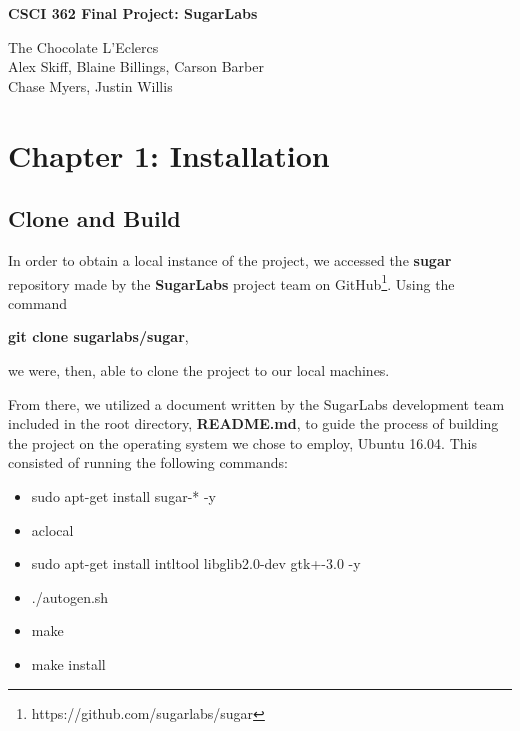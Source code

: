 \documentclass{article}
\begin{document}
\begin{center}
\textbf{CSCI 362 Final Project: SugarLabs}
\end{center}


\begin{center}

{The Chocolate L'Eclercs}\\
\vspace{0.2cm}
{Alex Skiff, Blaine Billings, Carson Barber}\\
{Chase Myers, Justin Willis}\\
\vspace{0.2cm}

\end{center}



\begin{abstract}
\end{abstract}

\section{Chapter 1: Installation}
\subsection{Clone and Build}
In order to obtain a local instance of the project, we accessed the \textbf{sugar} repository made by the \textbf{SugarLabs} project team on GitHub\footnote{https://github.com/sugarlabs/sugar}. Using the command 
\begin{center}
\textbf{git clone sugarlabs/sugar},
\end{center}
we were, then, able to clone the project to our local machines.

From there, we utilized a document written by the SugarLabs development team included in the root directory, \textbf{README.md}, to guide the process of building the project on the operating system we chose to employ, Ubuntu 16.04. This consisted of running the following commands:
\begin{itemize}
\itemsep-0.5em
\item[] sudo apt-get install sugar-* -y
\item[] aclocal
\item[] sudo apt-get install intltool libglib2.0-dev gtk+-3.0 -y
\item[] ./autogen.sh
\item[] make
\item[] make install
\end{itemize}
\end{document}
